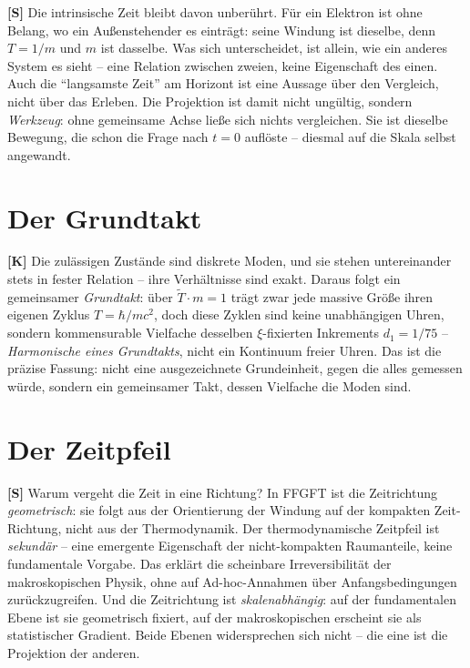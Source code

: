 \textbf{[S]} Die intrinsische Zeit bleibt davon unberührt. Für ein Elektron ist
ohne Belang, wo ein Außenstehender es einträgt: seine Windung ist dieselbe, denn
$T=1/m$ und $m$ ist dasselbe. Was sich unterscheidet, ist allein, wie ein anderes
System es sieht -- eine Relation zwischen zweien, keine Eigenschaft des einen.
Auch die \enquote{langsamste Zeit} am Horizont ist eine Aussage über den
Vergleich, nicht über das Erleben. Die Projektion ist damit nicht ungültig,
sondern \emph{Werkzeug}: ohne gemeinsame Achse ließe sich nichts vergleichen. Sie
ist dieselbe Bewegung, die schon die Frage nach $t=0$ auflöste -- diesmal auf die
Skala selbst angewandt.

\section{Der Grundtakt}

\textbf{[K]} Die zulässigen Zustände sind diskrete Moden, und sie stehen
untereinander stets in fester Relation -- ihre Verhältnisse sind exakt. Daraus
folgt ein gemeinsamer \emph{Grundtakt}: über $\tilde T\cdot m=1$ trägt zwar jede
massive Größe ihren eigenen Zyklus $T=\hbar/mc^2$, doch diese Zyklen sind keine
unabhängigen Uhren, sondern kommensurable Vielfache desselben $\xi$-fixierten
Inkrements $d_1=1/75$ -- \emph{Harmonische eines Grundtakts}, nicht ein Kontinuum
freier Uhren. Das ist die präzise Fassung: nicht eine ausgezeichnete Grundeinheit,
gegen die alles gemessen würde, sondern ein gemeinsamer Takt, dessen Vielfache die
Moden sind.

\section{Der Zeitpfeil}

\textbf{[S]} Warum vergeht die Zeit in eine Richtung? In FFGFT ist die
Zeitrichtung \emph{geometrisch}: sie folgt aus der Orientierung der Windung auf
der kompakten Zeit-Richtung, nicht aus der Thermodynamik. Der thermodynamische
Zeitpfeil ist \emph{sekundär} -- eine emergente Eigenschaft der nicht-kompakten
Raumanteile, keine fundamentale Vorgabe. Das erklärt die scheinbare
Irreversibilität der makroskopischen Physik, ohne auf Ad-hoc-Annahmen über
Anfangsbedingungen zurückzugreifen. Und die Zeitrichtung ist \emph{skalenabhängig}:
auf der fundamentalen Ebene ist sie geometrisch fixiert, auf der makroskopischen
erscheint sie als statistischer Gradient. Beide Ebenen widersprechen sich nicht --
die eine ist die Projektion der anderen.

